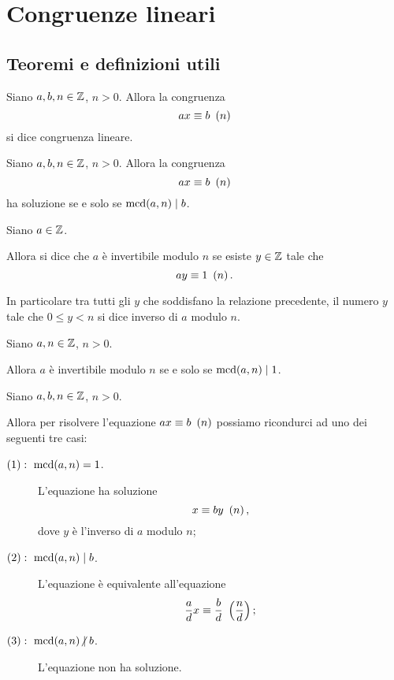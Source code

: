 \chapter{Congruenze lineari}

\section{Teoremi e definizioni utili}

\begin{definition}

    Siano $a, b, n \in \mathbb{Z}$, $n > 0$. Allora la congruenza \[
        ax \equiv b \ \left(n\right)    
    \] si dice congruenza lineare.
\end{definition}

\begin{proposition}
    \label{cond_risolubilita'}
    Siano $a, b, n \in \mathbb{Z}$, $n > 0$. Allora la congruenza \[
        ax \equiv b \ \left(n\right)    
    \] ha soluzione se e solo se $\operatorname{mcd}\!\left(a, n\right) \mid b$.
\end{proposition}

\begin{definition}
    Siano $a \in \mathbb{Z}$.
    
    Allora si dice che $a$ è invertibile modulo $n$ se esiste  $y \in \mathbb{Z}$ tale che \[
        ay \equiv 1 \ \left(n\right)
    .\]

    In particolare tra tutti gli $y$ che soddisfano la relazione precedente, il numero $y$ tale che $0 \leq y < n$ si dice inverso di $a$ modulo $n$.
\end{definition}

\begin{proposition}
    Siano $a, n \in \mathbb{Z}$, $n > 0$. 
    
    Allora $a$ è invertibile modulo $n$ se e solo se $\operatorname{mcd}\!\left(a, n\right) \mid 1$.
\end{proposition}

\begin{proposition} \label{risoluzione_congr_lineare}
    Siano $a, b, n \in \mathbb{Z}$, $n > 0$. 
    
    Allora per risolvere l'equazione $ax \equiv b \ \left(n\right)$ possiamo ricondurci ad uno dei seguenti tre casi:
    \begin{description}
        \item[$(1):\ \operatorname{mcd}\!\left(a, n\right) = 1$.] L'equazione ha soluzione \[
            x \equiv by \ \left(n\right),   
        \] dove $y$ è l'inverso di $a$ modulo $n$;
        \item[$(2):\ \operatorname{mcd}\!\left(a, n\right) \mid b$.]L'equazione è equivalente all'equazione \[
            \frac{a}{d} x \equiv \frac{b}{d} \ \left(\frac{n}{d}\right);
        \]
        \item[$(3):\ \mcd{a}{n} \ndivides b$.] L'equazione non ha soluzione.
    \end{description}
\end{proposition}


